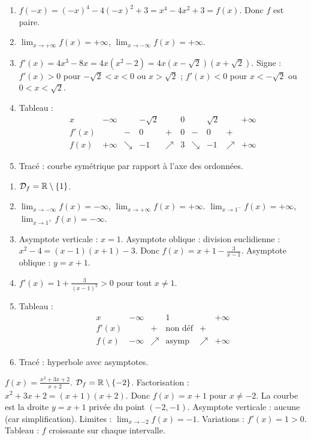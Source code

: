 \begin{enumerate}[label=\alph*)]
\item \(f(-x)=(-x)^4-4(-x)^2+3=x^4-4x^2+3=f(x)\). Donc \(f\) est paire.
\item \(\lim_{x\to +\infty}f(x)=+\infty\), \(\lim_{x\to -\infty}f(x)=+\infty\).
\item \(f'(x)=4x^3-8x=4x(x^2-2)=4x(x-\sqrt{2})(x+\sqrt{2})\). Signe : \(f'(x)>0\) pour \(-\sqrt{2}<x<0\) ou \(x>\sqrt{2}\) ; \(f'(x)<0\) pour \(x<-\sqrt{2}\) ou \(0<x<\sqrt{2}\).
\item Tableau :
\[
\begin{array}{c|ccccccccccc}
x & -\infty & & -\sqrt{2} & & 0 & & \sqrt{2} & & +\infty \\
\hline
f'(x) & & - & 0 & + & 0 & - & 0 & + & \\
\hline
f(x) & +\infty & \searrow & -1 & \nearrow & 3 & \searrow & -1 & \nearrow & +\infty
\end{array}
\]
\item Tracé : courbe symétrique par rapport à l'axe des ordonnées.
\end{enumerate}

\begin{enumerate}[label=\alph*)]
\item \(\mathcal{D}_f=\mathbb{R}\setminus\{1\}\).
\item \(\lim_{x\to -\infty}f(x)=-\infty\), \(\lim_{x\to +\infty}f(x)=+\infty\). \(\lim_{x\to 1^-}f(x)=+\infty\), \(\lim_{x\to 1^+}f(x)=-\infty\).
\item Asymptote verticale : \(x=1\). Asymptote oblique : division euclidienne : \(x^2-4=(x-1)(x+1)-3\). Donc \(f(x)=x+1-\frac{3}{x-1}\). Asymptote oblique : \(y=x+1\).
\item \(f'(x)=1+\frac{3}{(x-1)^2}>0\) pour tout \(x\neq1\).
\item Tableau :
\[
\begin{array}{c|ccccccccccc}
x & -\infty & & 1 & & +\infty \\
\hline
f'(x) & & + & \text{non déf} & + & \\
\hline
f(x) & -\infty & \nearrow & \text{asymp} & \nearrow & +\infty
\end{array}
\]
\item Tracé : hyperbole avec asymptotes.
\end{enumerate}

\(f(x)=\frac{x^2+3x+2}{x+2}\). \(\mathcal{D}_f=\mathbb{R}\setminus\{-2\}\). Factorisation : \(x^2+3x+2=(x+1)(x+2)\). Donc \(f(x)=x+1\) pour \(x\neq-2\). La courbe est la droite \(y=x+1\) privée du point \((-2,-1)\). Asymptote verticale : aucune (car simplification). Limites : \(\lim_{x\to -2}f(x)=-1\). Variations : \(f'(x)=1>0\). Tableau : \(f\) croissante sur chaque intervalle.

